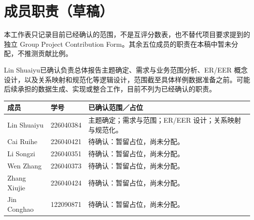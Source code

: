 \documentclass[11pt,a4paper]{article}
\begin{document}
\clearpage
\section{成员职责（草稿）}
本工作表只记录目前已经确认的范围，不是互评分数表，也不替代项目要求提到的独立 Group Project Contribution Form。其余五位成员的职责在本稿中暂未分配，不推测贡献比例。

Lin Shuaiyu已确认负责总体报告主题确定、需求与业务范围分析、ER/EER 概念设计，以及关系映射和规范化等逻辑设计，范围截至具体样例数据准备之前。可能后续承担的数据生成、实现或整合工作，目前不列为已经确认的职责。

\par\begingroup\small\noindent
\begin{tabularx}{\linewidth}{p{2.7cm}p{3cm}X}
\toprule
成员 & 学号 & 已确认范围／占位\\\midrule
Lin Shuaiyu & 226040384 & 主题确定；需求与范围；ER/EER 设计；关系映射与规范化。\\
Cai Ruihe & 226040421 & 待确认：暂留占位，尚未分配。\\
Li Songzi & 226040351 & 待确认：暂留占位，尚未分配。\\
Wen Zhang & 226040373 & 待确认：暂留占位，尚未分配。\\
Zhang Xiujie & 226040424 & 待确认：暂留占位，尚未分配。\\
Jin Conghao & 122090871 & 待确认：暂留占位，尚未分配。\\
\bottomrule
\end{tabularx}
\par\endgroup
\end{document}
